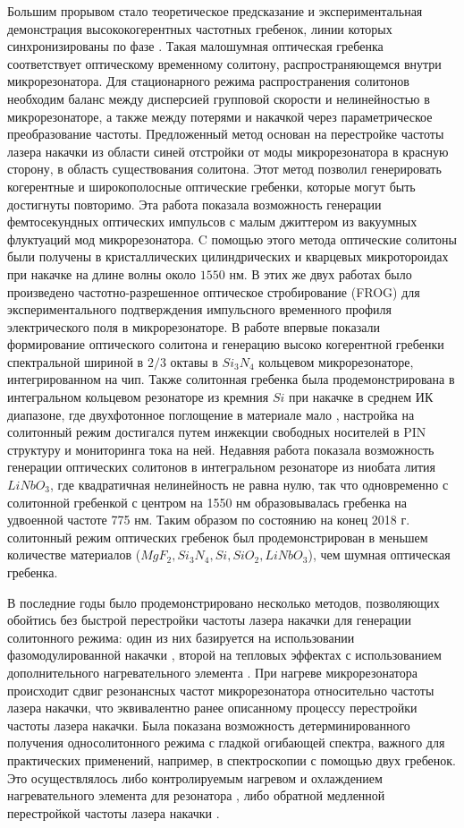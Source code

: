 Большим прорывом стало теоретическое предсказание и экспериментальная демонстрация высококогерентных частотных гребенок, линии которых синхронизированы по фазе \cite{Herr2014}. Такая малошумная оптическая гребенка соответствует оптическому временному солитону, распространяющемся внутри микрорезонатора. Для стационарного режима распространения солитонов необходим баланс между дисперсией групповой скорости и нелинейностью в микрорезонаторе, а также между потерями и накачкой через параметрическое преобразование частоты. Предложенный метод основан на перестройке частоты лазера накачки из области синей отстройки от моды микрорезонатора в красную сторону, в область существования солитона. Этот метод позволил генерировать когерентные и широкополосные оптические гребенки, которые могут быть достигнуты повторимо. Эта работа показала возможность генерации фемтосекундных оптических импульсов с малым джиттером из вакуумных флуктуаций мод микрорезонатора. C помощью этого метода оптические солитоны были получены в кристаллических цилиндрических \cite{Herr2014} и кварцевых микротороидах \cite{Yi2015} при накачке на длине волны около $1550$ нм. В этих же двух работах было произведено частотно-разрешенное оптическое стробирование (FROG) для экспериментального подтверждения импульсного временного профиля электрического поля в микрорезонаторе. В работе \cite{Brasch2016} впервые показали формирование оптического солитона и генерацию высоко когерентной гребенки спектральной шириной в $2/3$ октавы в $Si_3N_4$ кольцевом микрорезонаторе, интегрированном на чип. Также солитонная гребенка была продемонстрирована в интегральном кольцевом резонаторе из кремния $Si$ при накачке в среднем ИК диапазоне, где двухфотонное поглощение в материале мало \cite{Yu2016}, настройка на солитонный режим достигался путем инжекции свободных носителей в PIN структуру и мониторинга тока на ней. Недавняя работа показала возможность генерации оптических солитонов в интегральном резонаторе из ниобата лития $LiNbO_3$, где квадратичная нелинейность не равна нулю, так что одновременно с солитонной гребенкой с центром на 1550 нм образовывалась гребенка на удвоенной частоте 775 нм. Таким образом по состоянию на конец 2018 г. солитонный режим оптических гребенок был продемонстрирован в меньшем количестве материалов ($MgF_2, Si_3N_4, Si, SiO_2, LiNbO_3$), чем шумная оптическая гребенка.

В последние годы было продемонстрировано несколько методов, позволяющих обойтись без быстрой перестройки частоты лазера накачки для генерации солитонного режима: один из них базируется на использовании фазомодулированной накачки \cite{Jang2015ol}, второй на тепловых эффектах с использованием дополнительного нагревательного элемента \cite{Joshi2016}. При нагреве микрорезонатора происходит сдвиг резонансных частот микрорезонатора относительно частоты лазера накачки, что эквивалентно ранее описанному процессу перестройки частоты лазера накачки. Была показана возможность детерминированного получения односолитонного режима с гладкой огибающей спектра, важного для практических применений, например, в спектроскопии с помощью двух гребенок. Это осуществлялось либо контролируемым нагревом и охлаждением нагревательного элемента для резонатора \cite{Joshi2016}, либо обратной медленной перестройкой частоты лазера накачки \cite{Karpov2017}.

